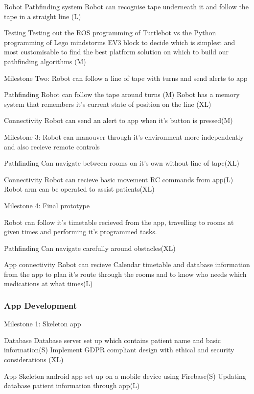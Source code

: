 \documentclass{article}
\begin{document}
Robot Pathfinding system
    Robot can recognise tape underneath it and follow the tape in a straight line (L)
    
Testing
    Testing out the ROS programming of Turtlebot vs the Python programming of Lego mindstorms EV3 block to decide which is simplest and     most customisable to find the best platform solution on which to build our pathfinding algorithms (M)

Milestone Two: Robot can follow a line of tape with turns and send alerts to app 

Pathfinding
    Robot can follow the tape around turns (M)
    Robot has a memory system that remembers it's current state of position on the line (XL)
    
Connectivity    
    Robot can send an alert to app when it's button is pressed(M) 
    
Milestone 3: Robot can manouver through it's environment more independently and also recieve remote controls
    
Pathfinding
    Can navigate between rooms on it's own without line of tape(XL)
    
Connectivity 
    Robot can recieve basic movement RC commands from app(L)
    Robot arm can be operated to assist patients(XL)   
   
    
Milestone 4: Final prototype

Robot can follow it's timetable recieved from the app, travelling to rooms at given times and performing it's programmed tasks.

Pathfinding
    Can navigate carefully around obstacles(XL)       
    
App connectivity 
    Robot can recieve Calendar timetable and database information from the app to plan it's route through the rooms and to know who         needs which medications at what times(L)
    
\subsubsection{App Development}

Milestone 1: Skeleton app

Database
    Database server set up which contains patient name and basic information(S)
    Implement GDPR compliant design with ethical and security considerations (XL)
    
App
    Skeleton android app set up on a mobile device using Firebase(S)
    Updating database patient information through app(L)
    
\end{document}
